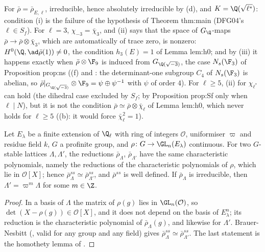 \begin{paperlink}
For $\bar\rho=\bar\rho_{E,\ell}$, irreducible, hence absolutely irreducible by (d), and $K=\Q(\sqrt{\ell^*})$: condition (i) is the
failure of the hypothesis of Theorem thm:main (DFG04's $\ell\in S_f$). For $\ell=3$, $\chi_{-3}=\bar\chi_3$, and (ii) says that the space of $G_\Q$-maps
$\bar\rho\to\bar\rho\otimes\bar\chi_3$, which are automatically of trace zero, is nonzero: $H^0(\Q,\ad\bar\rho(1))\ne0$, the condition $h_3(E)=1$ of Lemma lem:h0; and by
(iii) it happens exactly when $\bar\rho\otimes\F_9$ is induced from $G_{\Q(\sqrt{-3})}$, the case $N_s(\F_3)$ of Proposition prop:ns ((f)
and : the determinant-one subgroup $C_4$ of $N_s(\F_3)$ is abelian, so $\bar\rho|_{G_{\Q(\sqrt{-3})}}\otimes\F_9=\psi\oplus\psi^{-1}$ with $\psi$ of order $4$). For
$\ell\ge5$, (ii) for $\chi_{\ell^*}$ can hold (the dihedral case excluded by $S_f$; by Proposition prop:Sf only when $\ell\mid N$), but it is not the condition $\bar\rho\simeq\bar\rho\otimes\bar\chi_\ell$ of Lemma lem:h0,
which never holds for $\ell\ge5$ ((b): it would force $\bar\chi_\ell^2=1$).
\end{paperlink}

\begin{proposition}\label{prop:galois:reduction-ss}
Let $E_\lambda$ be a finite extension of $\Q_\ell$ with ring of integers $\mathcal{O}$, uniformiser $\varpi$ and residue field $k$, $G$ a profinite group, and
$\rho\colon G\to\GL_n(E_\lambda)$ continuous. For two $G$-stable lattices $\Lambda,\Lambda'$, the reductions $\bar\rho_\Lambda$, $\bar\rho_{\Lambda'}$ have the same characteristic
polynomials, namely the reductions of the characteristic polynomials of $\rho$, which lie in $\mathcal{O}[X]$; hence $\bar\rho_\Lambda^{ss}\simeq\bar\rho_{\Lambda'}^{ss}$, and
$\bar\rho^{ss}$ is well defined. If $\bar\rho_\Lambda$ is irreducible, then $\Lambda'=\varpi^m\Lambda$ for some $m\in\Z$.
\end{proposition}

\begin{proof}
In a basis of $\Lambda$ the matrix of $\rho(g)$ lies in $\GL_n(\mathcal{O})$, so $\det(X-\rho(g))\in\mathcal{O}[X]$, and it does not depend on the basis of $E_\lambda^n$; its
reduction is the characteristic polynomial of $\bar\rho_\Lambda(g)$, and likewise for $\Lambda'$. Brauer-Nesbitt (, valid for any group and any field)
gives $\bar\rho_\Lambda^{ss}\simeq\bar\rho_{\Lambda'}^{ss}$. The last statement is the homothety lemma of .
\end{proof}

